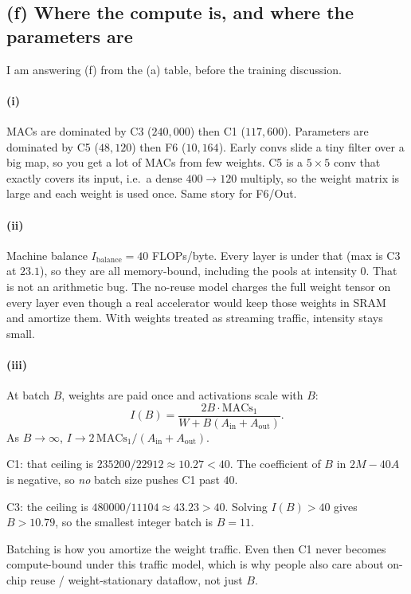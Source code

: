 \documentclass[11pt]{article}
\begin{document}
\subsection*{(f) Where the compute is, and where the parameters are}

I am answering (f) from the (a) table, before the training discussion.

\paragraph{(i)}
MACs are dominated by C3 (\(240{,}000\)) then C1 (\(117{,}600\)).
Parameters are dominated by C5 (\(48{,}120\)) then F6 (\(10{,}164\)).
Early convs slide a tiny filter over a big map, so you get a lot of MACs
from few weights. C5 is a \(5\times5\) conv that exactly covers its
input, i.e.\ a dense \(400\to120\) multiply, so the weight matrix is
large and each weight is used once. Same story for F6/Out.

\paragraph{(ii)}
Machine balance \(I_{\mathrm{balance}}=40\) FLOPs/byte. Every layer is
under that (max is C3 at \(23.1\)), so they are all memory-bound,
including the pools at intensity \(0\). That is not an arithmetic bug.
The no-reuse model charges the full weight tensor on every layer even
though a real accelerator would keep those weights in SRAM and amortize
them. With weights treated as streaming traffic, intensity stays small.

\paragraph{(iii)}
At batch \(B\), weights are paid once and activations scale with \(B\):
\[
I(B)=\frac{2B\cdot\mathrm{MACs}_1}{W + B(A_{\mathrm{in}}+A_{\mathrm{out}})}.
\]
As \(B\to\infty\), \(I\to 2\,\mathrm{MACs}_1/(A_{\mathrm{in}}+A_{\mathrm{out}})\).

C1: that ceiling is \(235200/22912\approx 10.27<40\). The coefficient of
\(B\) in \(2M-40A\) is negative, so \emph{no} batch size pushes C1 past
\(40\).

C3: the ceiling is \(480000/11104\approx 43.23>40\). Solving
\(I(B)>40\) gives \(B>10.79\), so the smallest integer batch is
\(B=11\).

Batching is how you amortize the weight traffic. Even then C1 never
becomes compute-bound under this traffic model, which is why people also
care about on-chip reuse / weight-stationary dataflow, not just \(B\).
\end{document}
